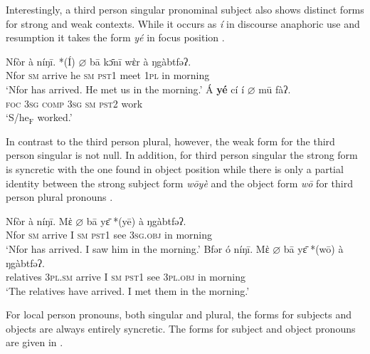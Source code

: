 \documentclass[output=paper]{langscibook}
\begin{document}
Interestingly, a third person singular pronominal subject also shows distinct forms for strong and weak contexts. While it occurs as \textit{í} in discourse anaphoric use  and resumption  it takes the form \textit{yé} in focus position .

\ea
\begin{xlist}
\ex \label{ex:johanneshein:3sgdiscourse}
\gll Nfòr à níŋī. *(Í) $\varnothing$ bā kɔ̄nī wὲr à ŋgàbtfəʔ.\\
Nfor \textsc{sm} arrive \hphantom{(*}he \textsc{sm} \textsc{pst1} meet \textsc{1pl} in morning\\
\glt `Nfor has arrived. He met us in the morning.'
\ex \label{ex:johanneshein:3rdpron}
\gll Á \textbf{yé} cí í $\varnothing$ mū fàʔ.\\
\textsc{foc} \textsc{3sg} \textsc{comp} \textsc{3sg} \textsc{sm} \textsc{pst2} work\\
\glt `S/he$_{\text{F}}$ worked.'
\end{xlist}
\z
In contrast to the third person plural,
however, the weak form for the third person singular is not null.
In addition, for third person singular the strong form is syncretic with the one found in object position  while there is only a partial identity between the strong subject form \textit{wōyè} and the object form \textit{wō} for third person plural pronouns .

\ea\label{ex:johanneshein:obj}
\begin{xlist}
\ex \label{ex:johanneshein:objpron}
\gll Nfòr à níŋī. Mὲ $\varnothing$ bā yɛ̄ *(yē) à ŋgàbtfəʔ.\\
Nfor \textsc{sm} arrive I \textsc{sm} \textsc{pst1} see \hphantom{(*}\textsc{3sg.obj} in morning\\
\glt `Nfor has arrived. I saw him in the morning.'
\ex \label{ex:johanneshein:objpronpl}
\gll Bfər ó níŋī. Mὲ $\varnothing$ bā yɛ̄ *(wō) à ŋgàbtfəʔ.\\
relatives \textsc{3pl.sm} arrive I \textsc{sm} \textsc{pst1} see \hphantom{(*}\textsc{3pl.obj} in morning\\
\glt `The relatives have arrived. I met them in the morning.'
\end{xlist}
\z
For local person pronouns, both singular and plural, the forms for subjects and objects are always entirely syncretic. The forms for subject and object pronouns are given in . 
\end{document}
